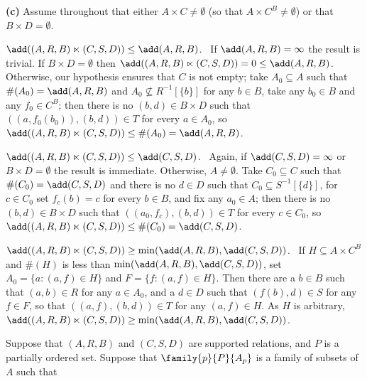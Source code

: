 {\medskip

{\bf (c)} Assume throughout that either $A\times C\ne\emptyset$ (so that
$A\times C^B\ne\emptyset$) or that $B\times D=\emptyset$.

\medskip

 $\add((A,R,B)\ltimes(C,S,D))\le\add(A,R,B)$.   \Prf\ If
$\add(A,R,B)=\infty$ the result is trivial.   If $B\times D=\emptyset$
then $\add((A,R,B)\ltimes(C,S,D))=0\le\add(A,R,B)$.   Otherwise, our
hypothesis ensures that $C$ is not empty;  take
$A_0\subseteq A$ such that $\#(A_0)=\add(A,R,B)$ and
$A_0\not\subseteq R^{-1}[\{b\}]$ for any $b\in B$, take any $b_0\in B$
and any $f_0\in C^B$;  then there is no $(b,d)\in B\times D$ such that
$((a,f_0(b_0)),(b,d))\in T$ for every $a\in A_0$, so
$\add((A,R,B)\ltimes(C,S,D))\le\#(A_0)=\add(A,R,B)$.\ \Qed

\medskip

 $\add((A,R,B)\ltimes(C,S,D))\le\add(C,S,D)$.   \Prf\
Again, if $\add(C,S,D)=\infty$ or $B\times D=\emptyset$ the result is
immediate.   Otherwise, $A\ne\emptyset$.   Take
$C_0\subseteq C$ such that $\#(C_0)=\add(C,S,D)$ and there is no
$d\in D$ such that $C_0\subseteq S^{-1}[\{d\}]$, for
$c\in C_0$ set $f_c(b)=c$ for every $b\in B$, and fix any $a_0\in A$;
then there is no $(b,d)\in B\times D$ such that
$((a_0,f_c),(b,d))\in T$ for every $c\in C_0$, so
$\add((A,R,B)\ltimes(C,S,D))\le\#(C_0)=\add(C,S,D)$.\ \Qed

\medskip

$\add((A,R,B)\ltimes(C,S,D))\ge\min(\add(A,R,B),\add(C,S,D))$.
\Prf\ If
$H\subseteq A\times C^B$ and $\#(H)$ is less than
$\min(\add(A,R,B),\add(C,S,D))$, set
$A_0=\{a:(a,f)\in H\}$ and $F=\{f:(a,f)\in H\}$.
Then there are a $b\in B$ such that $(a,b)\in R$ for any $a\in A_0$,
and a $d\in D$ such that $(f(b),d)\in S$ for any $f\in F$, so that
$((a,f),(b,d))\in T$ for any $(a,f)\in H$.   As $H$ is arbitrary,
$\add((A,R,B)\ltimes(C,S,D))\ge\min(\add(A,R,B),\add(C,S,D))$.\ \Qed
}%

 Suppose that $(A,R,B)$ and $(C,S,D)$ are supported
relations, and $P$ is a partially ordered set.   Suppose that
$\family{p}{P}{A_p}$ is a family of subsets of $A$ such that


